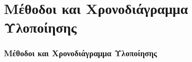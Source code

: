 \section{Μέθοδοι και Χρονοδιάγραμμα Υλοποίησης}
\begin{frame}
	\frametitle{Μέθοδοι και Χρονοδιάγραμμα Υλοποίησης}
\end{frame}
